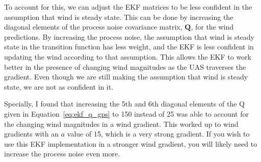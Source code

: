 To account for this, we can adjust the EKF matrices to be less confident in the assumption that wind is steady state.
This can be done by increasing the diagonal elements of the process noise covariance matrix, $\mathbf{Q}$, for the wind predictions. 
By increasing the process noise, the assumption that wind is steady state in the transition function has less weight, and the EKF is less confident in updating the wind according to that assumption. 
This allows the EKF to work better in the presence of changing wind magnitudes as the UAS traverses the gradient. Even though we are still making the assumption that wind is steady state, we are not as confident in it.

Specially, I found that increasing the 5th and 6th diagonal elements of the Q given in Equation~\ref{eq:ekf_q_gps} to 150 instead of 25 was able to account for the changing wind magnitudes in a wind gradient.
This worked up to wind gradients with an $a$ value of 15, which is a very strong gradient. If you wish to use this EKF implementation in a stronger wind gradient, you will likely need to increase the process noise even more.
